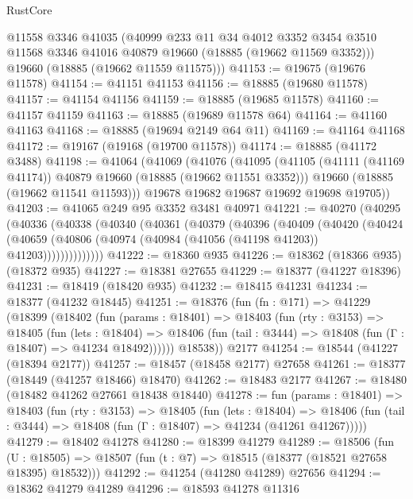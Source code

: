 \begin{lexlean}{RustCore}
\begin{coremodule}
      @11558
      @3346
      @41035
      (@40999
        @233
        @11
        @34
        @4012
        @3352
        @3454
        @3510
        @11568
        @3346
        @41016
        @40879
        @19660
        (@18885 (@19662 @11569 @3352)))
      @19660
      (@18885 (@19662 @11559 @11575)))
@41153 := @19675 (@19676 @11578)
@41154 := @41151 @41153
@41156 := @18885 (@19680 @11578)
@41157 := @41154 @41156
@41159 := @18885 (@19685 @11578)
@41160 := @41157 @41159
@41163 := @18885 (@19689 @11578 @64)
@41164 := @41160 @41163
@41168 := @18885 (@19694 @2149 @64 @11)
@41169 := @41164 @41168
@41172 := @19167 (@19168 (@19700 @11578))
@41174 := @18885 (@41172 @3488)
@41198 := @41064
    (@41069
      (@41076
        (@41095
          (@41105 (@41111 (@41169 @41174)) @40879 @19660 (@18885 (@19662 @11551 @3352)))
          @19660
          (@18885 (@19662 @11541 @11593)))
        @19678
        @19682
        @19687
        @19692
        @19698
        @19705))
@41203 := @41065 @249 @95 @3352 @3481 @40971
@41221 := @40270
    (@40295
      (@40336
        (@40338
          (@40340
            (@40361
              (@40379
                (@40396
                  (@40409
                    (@40420
                      (@40424
                        (@40659
                          (@40806 (@40974 (@40984 (@41056 (@41198 @41203)) @41203))))))))))))))
@41222 := @18360 @935
@41226 := @18362 (@18366 @935) (@18372 @935)
@41227 := @18381 @27655
@41229 := @18377 (@41227 @18396)
@41231 := @18419 (@18420 @935)
@41232 := @18415 @41231
@41234 := @18377 (@41232 @18445)
@41251 := @18376
    (fun (fn : @171) =>
    @41229
      (@18399
        (@18402
          (fun (params : @18401) =>
          @18403
            (fun (rty : @3153) =>
            @18405
              (fun (lets : @18404) =>
              @18406 (fun (tail : @3444) => @18408 (fun (Γ : @18407) => @41234 @18492))))))
        @18538))
    @2177
@41254 := @18544 (@41227 (@18394 @2177))
@41257 := @18457 (@18458 @2177) @27658
@41261 := @18377 (@18449 (@41257 @18466) @18470)
@41262 := @18483 @2177
@41267 := @18480 (@18482 @41262 @27661 @18438 @18440)
@41278 := fun (params : @18401) =>
  @18403
    (fun (rty : @3153) =>
    @18405
      (fun (lets : @18404) =>
      @18406 (fun (tail : @3444) => @18408 (fun (Γ : @18407) => @41234 (@41261 @41267)))))
@41279 := @18402 @41278
@41280 := @18399 @41279
@41289 := @18506
    (fun (U : @18505) => @18507 (fun (t : @7) => @18515 (@18377 (@18521 @27658 @18395) @18532)))
@41292 := @41254 (@41280 @41289) @27656
@41294 := @18362 @41279 @41289
@41296 := @18593 @41278 @11316

\end{coremodule}
\end{lexlean}
